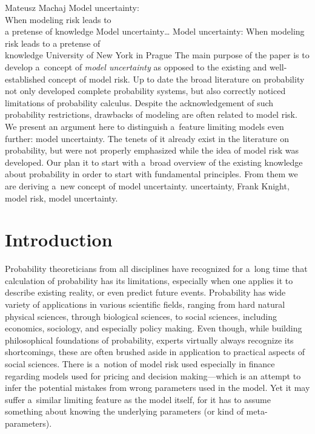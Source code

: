 \begin{artengenv}{Mateusz Machaj}
	{Model uncertainty:\\When modeling risk leads to\\a pretense of knowledge}
	{Model uncertainty\ldots}
	{Model uncertainty: When modeling risk leads to a pretense of\\knowledge}
	{University of New York in Prague\label{machaj-firstpage}}
	{The main purpose of the paper is to develop a~concept of \textit{model uncertainty} as opposed to the existing and well-established concept of model risk. Up to date the broad literature on probability not only developed complete probability systems, but also correctly noticed limitations of probability calculus. Despite the acknowledgement of such probability restrictions, drawbacks of modeling are often related to model risk. We present an argument here to distinguish a~feature limiting models even further: model uncertainty. The tenets of it already exist in the literature on probability, but were not properly emphasized while the idea of model risk was developed. Our plan it to start with a~broad overview of the existing knowledge about probability in order to start with fundamental principles. From them we are deriving a~new concept of model uncertainty.
	}
	{uncertainty, Frank Knight, model risk, model uncertainty.}





\section{Introduction}

\lettrine[loversize=0.13,lines=2,lraise=-0.03,nindent=0em,findent=0.2pt]%
{P}{}robability theoreticians from all disciplines have recognized for a~long time that calculation of probability has its limitations, especially when one applies it to describe existing reality, or even predict future events. Probability has wide variety of applications in various scientific fields, ranging from hard natural physical sciences, through biological sciences, to social sciences, including economics, sociology, and especially policy making. Even though, while building philosophical foundations of probability, experts virtually always recognize its shortcomings, these are often brushed aside in application to practical aspects of social sciences. There is a~notion of model risk used especially in finance regarding models used for pricing and decision making---which is an attempt to infer the potential mistakes from wrong parameters used in the model. Yet it may suffer a~similar limiting feature as the model itself, for it has to assume something about knowing the underlying parameters (or kind of meta-parameters).




\end{artengenv}
